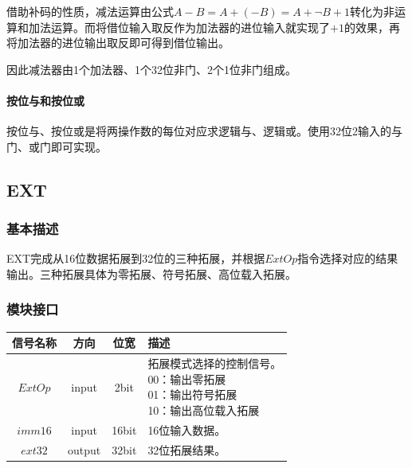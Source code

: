 \documentclass[main.tex]{subfiles}
\begin{document}
借助补码的性质，减法运算由公式$A-B = A+(-B) = A+\neg B+1$转化为非运算和加法运算。而将借位输入取反作为加法器的进位输入就实现了$+1$的效果，再将加法器的进位输出取反即可得到借位输出。

因此减法器由1个加法器、1个32位非门、2个1位非门组成。

\paragraph{按位与和按位或}
按位与、按位或是将两操作数的每位对应求逻辑与、逻辑或。使用32位2输入的与门、或门即可实现。


\clearpage
\subsection{EXT}
\subsubsection{基本描述}
EXT完成从16位数据拓展到32位的三种拓展，并根据$ExtOp$指令选择对应的结果输出。三种拓展具体为零拓展、符号拓展、高位载入拓展。

\subsubsection{模块接口}
\begin{center}
    \begin{tabular}[]{c c c l}
        \toprule
        信号名称 & 方向 & 位宽 & 描述 \\
        \midrule
        $ExtOp$ & input & 2bit & \makecell[lt]{
            拓展模式选择的控制信号。\\
             00：输出零拓展 \\
             01：输出符号拓展 \\
             10：输出高位载入拓展 \\
        } \\
        \midrule
        $imm16$ & input & 16bit & 16位输入数据。\\
        $ext32$ & output & 32bit & 32位拓展结果。 \\
        \bottomrule
    \end{tabular}
\end{center}
\end{document}
